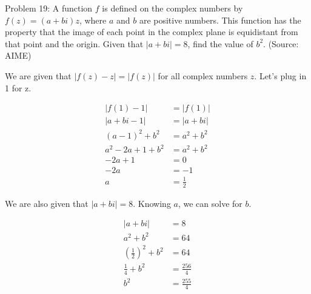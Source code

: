 Problem 19: A function $f$ is defined on the complex numbers by $f(z) = (a + bi)z$, where $a$ and $b$ are positive numbers. This function has the property that the image of each point in the complex plane is equidistant from that point and the origin. Given that $|a + bi| = 8$, find the value of $b^2$. (Source: AIME)

We are given that $|f(z) - z| = |f(z)|$ for all complex numbers $z$. Let's plug in 1 for z.

\begin{align*}
|f(1) - 1| &= |f(1)| \\
|a + bi - 1| &= |a + bi| \\
(a - 1)^2 + b^2 &= a^2 + b^2 \\
a^2 - 2a + 1 + b^2 &= a^2 + b^2 \\
-2a + 1 &= 0 \\
-2a &= -1 \\
a &= \frac{1}{2}
\end{align*}

We are also given that $|a + bi| = 8$. Knowing $a$, we can solve for $b$.

\begin{align*}
|a + bi| &= 8 \\
a^2 + b^2 &= 64 \\
\left(\frac{1}{2}\right)^2 + b^2 &= 64 \\
\frac{1}{4} + b^2 &= \frac{256}{4} \\
b^2 &= \boxed{\frac{255}{4}}
\end{align*}
